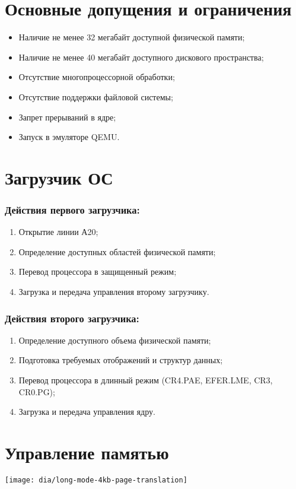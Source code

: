 \documentclass[12pt]{article}
\begin{document}
\section{\textbf{Основные допущения и ограничения}}
\begin{itemize}
\item Наличие не менее 32 мегабайт доступной физической памяти;
\item Наличие не менее 40 мегабайт доступного дискового пространства;
\item Отсутствие многопроцессорной обработки;
\item Отсутствие поддержки файловой системы;
\item Запрет прерываний в ядре;
\item Запуск в эмуляторе QEMU.
\end{itemize}


\section{\textbf{Загрузчик ОС}}
\subsubsection{Действия первого загрузчика:}
\begin{enumerate}
\item Открытие линии А20;
\item Определение доступных областей физической памяти;
\item Перевод процессора в защищенный режим;
\item Загрузка и передача управления второму загрузчику.
\end{enumerate}

\subsubsection{Действия второго загрузчика:}
\begin{enumerate}
\item Определение доступного объема физической памяти;
\item Подготовка требуемых отображений и структур данных;
\item Перевод процессора в длинный режим (CR4.PAE, EFER.LME, CR3, CR0.PG);
\item Загрузка и передача управления ядру.
\end{enumerate}


\section{\textbf{Управление памятью}}
\texttt{[image: dia/long-mode-4kb-page-translation]}
\end{document}
